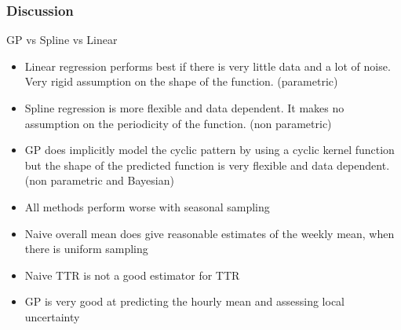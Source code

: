 \documentclass[
	8pt, %
]{beamer}
\begin{document}
\begin{frame}

	\frametitle{Discussion}


	GP vs Spline vs Linear
	\begin{itemize}
		\item Linear regression performs best if there is very little data
		and a lot of noise.
		Very rigid assumption on the shape of the function.
		(parametric)

		\item Spline regression is more flexible and data dependent.
		It makes no assumption on the periodicity of the function.
		(non parametric)

		\item GP does implicitly model the cyclic pattern by using a cyclic
		kernel function but the shape of the predicted function is very flexible and
		data dependent.
		(non parametric and Bayesian)
	\end{itemize}

	\bigskip

	\begin{itemize}
		\item All methods perform worse with seasonal sampling
		\item Naive overall mean does give reasonable estimates of the weekly
		mean, when there is uniform sampling
		\item Naive TTR is not a good estimator for TTR
		\item GP is very good at predicting the hourly mean and assessing
		local uncertainty
	\end{itemize}



\end{frame}
\end{document}
